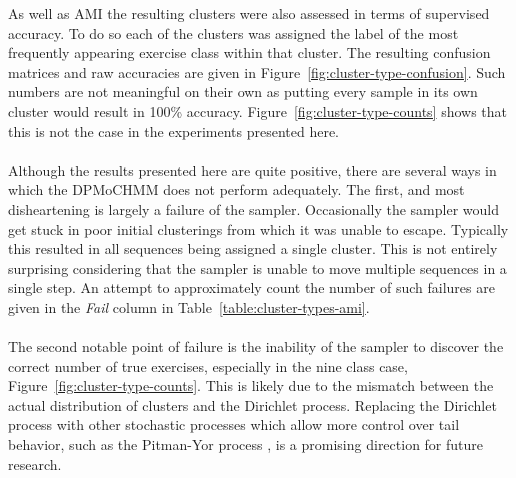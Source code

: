 \documentclass[12pt]{report}
\newcommand{\1}[0]{\mathbbm{1}}
\begin{document}
As well as \ac{AMI} the resulting clusters were also assessed in terms of
supervised accuracy. To do so each of the clusters was assigned the label of the most
frequently appearing exercise class within that cluster. The resulting confusion
matrices and raw accuracies are given in Figure~\ref{fig:cluster-type-confusion}.
Such numbers are not meaningful on their own as putting every sample in its
own cluster would result in 100\% accuracy. Figure~\ref{fig:cluster-type-counts} shows that
this is not the case in the experiments presented here. %
\\\\
Although the results presented here are quite positive, there are several ways in
which the \ac{DPMoCHMM} does not perform adequately. The first, and most disheartening
is largely a failure of the sampler. Occasionally the sampler would get stuck in poor
initial clusterings from which it was unable to escape. Typically this resulted in all
sequences being assigned a single cluster. This is not entirely surprising considering that
the sampler is unable to move multiple sequences in a single step. An attempt to approximately
count the number of such failures are given in the \emph{Fail} column in Table~\ref{table:cluster-types-ami}.
\\\\
The second notable point of failure is the inability of the sampler to discover the correct
number of true exercises, especially in the nine class case, Figure~\ref{fig:cluster-type-counts}.
This is likely due to the mismatch between the actual distribution of clusters and the
Dirichlet process. Replacing the Dirichlet process with other stochastic processes which
allow more control over tail behavior, such as the Pitman-Yor process \cite{pitman-yor-teh},
is a promising direction for future research.
\end{document}
